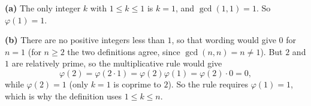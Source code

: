 \textbf{(a)} The only integer $k$ with $1\le k\le1$ is $k=1$, and $\gcd(1,1)=1$. So $\varphi(1)=\boxed{1}$.

\textbf{(b)} There are no positive integers less than $1$, so that wording would give $0$ for $n=1$ (for $n\ge2$ the two definitions agree, since $\gcd(n,n)=n\ne1$). But $2$ and $1$ are relatively prime, so the multiplicative rule would give
\[\varphi(2)=\varphi(2\cdot1)=\varphi(2)\varphi(1)=\varphi(2)\cdot0=0,\]
while $\varphi(2)=1$ (only $k=1$ is coprime to $2$). So the rule requires $\varphi(1)=1$, which is why the definition uses $1\le k\le n$.

